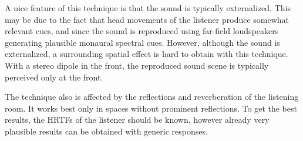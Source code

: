 \documentclass[10pt,a4paper,oneside]{article}
\begin{document}
A nice feature of this technique is that the sound is typically externalized. This may be due to the fact that head movements of the listener produce somewhat relevant cues, and since the sound is reproduced using far-field loudspeakers generating plausible monaural spectral cues. However, although the sound is externalized, a surrounding spatial effect is hard to obtain with this technique. With a stereo dipole in the front, the reproduced sound scene is typically perceived only at the front.

The technique also is affected by the reflections and reverberation of the listening room. It works best only in spaces without prominent reflections. To get the best results, the HRTFs of the listener should be known, however already very plausible results can be obtained with generic responses.
\end{document}
